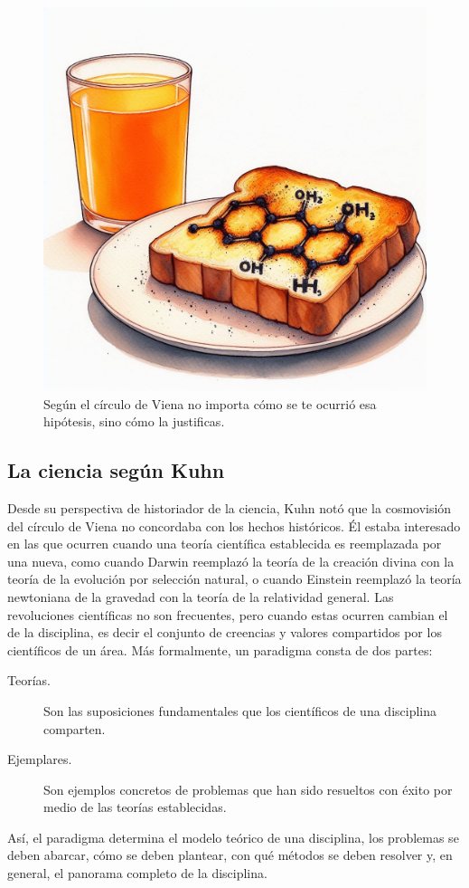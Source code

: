 \begin{figure}[ht]
    \centering
    \includegraphics[width=0.8\linewidth]{img/formaciondehipotesis}
    \caption{Según el círculo de Viena no importa cómo se te ocurrió esa
        hipótesis, sino cómo la justificas.}
\end{figure}

\subsection*{La ciencia según Kuhn}

Desde su perspectiva de historiador de la ciencia, Kuhn notó que la cosmovisión
del círculo de Viena no concordaba con los hechos históricos.
Él estaba interesado en las  que ocurren cuando una teoría científica establecida
es reemplazada por una nueva, como cuando Darwin reemplazó la teoría de la
creación divina con la teoría de la evolución por selección natural, o cuando
Einstein reemplazó la teoría newtoniana de la gravedad con la teoría de la
relatividad general.
Las revoluciones científicas no son frecuentes, pero cuando estas ocurren
cambian el  de la disciplina, es decir el conjunto de
creencias y valores compartidos por los científicos de un área.
Más formalmente, un paradigma consta de dos partes:
\begin{description}
    \item[Teorías.] Son las suposiciones fundamentales que los científicos de
        una disciplina comparten.
    \item[Ejemplares.] Son ejemplos concretos de problemas que han sido
        resueltos con éxito por medio de las teorías establecidas.
\end{description}
Así, el paradigma determina el modelo teórico de una disciplina, los problemas
se deben abarcar, cómo se deben plantear, con qué métodos se deben resolver y,
en general, el panorama completo de la disciplina.


